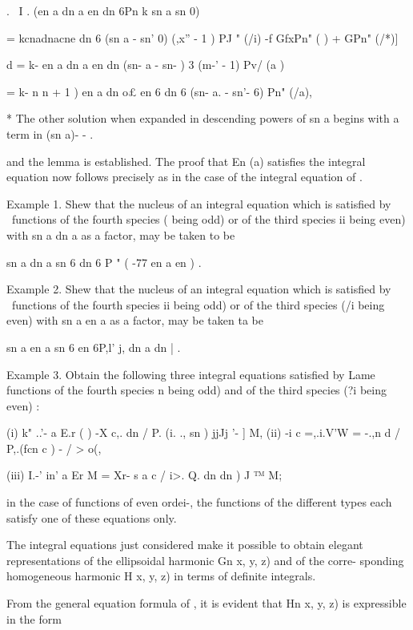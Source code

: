 {{{{{{{{. \ I . (en a dn a en dn 6Pn k sn a sn 0)\

= kcnadnacne dn 6 (sn a - sn' 0) (,x'' - 1 ) PJ " (/i) -f GfxPn" ( ) +
GPn" (/*)]

d = k- en a dn a en dn (sn- a - sn- ) 3 (m-' - 1) Pv/ (a )

= k- n n + 1 ) en a dn o£ en 6 dn 6 (sn- a. - sn'- 6) Pn" (/a),

* The other solution when expanded in descending powers of sn a begins
with a term in (sn a)- - .

%
%

and the lemma is established. The proof that En (a) satisfies the
integral equation now follows precisely as in the case of the integral
equation of .

Example 1. Shew that the nucleus of an integral equation which is
satisfied by \Lame\ functions of the fourth species ( being odd) or of
the third species ii being even) with sn a dn a as a factor, may be
taken to be

sn a dn a sn 6 dn 6 P " ( -77 en a en ) .

Example 2. Shew that the nucleus of an integral equation which is
satisfied by \Lame\ functions of the fourth species ii being odd) or of
the third species (/i being even) with sn a en a as a factor, may be
taken ta be

sn a en a sn 6 en 6P,l' j, dn a dn | .

Example 3. Obtain the following three integral equations satisfied by
Lame functions of the fourth species n being odd) and of the third
species (?i being even) :

(i) k" ..'- a E.r ( ) -X c,. dn / P. (i. ., sn ) jjJj '- ] M, (ii) -i
c =,.i.V'W = -.,n d / P,.(fcn c ) - / > o(,

(iii) I.-' in' a Er M = Xr- s a c / i>. Q. dn dn ) J ™ M;

in the case of functions of even ordei-, the functions of the
different types each satisfy one of these equations only.


The integral equations just considered make it possible to obtain
elegant representations of the ellipsoidal harmonic Gn x, y, z) and of
the corre- sponding homogeneous harmonic H x, y, z) in terms of
definite integrals.

From the general equation formula of , it is evident that Hn x,
y, z) is expressible in the form

}}}}}}}}
